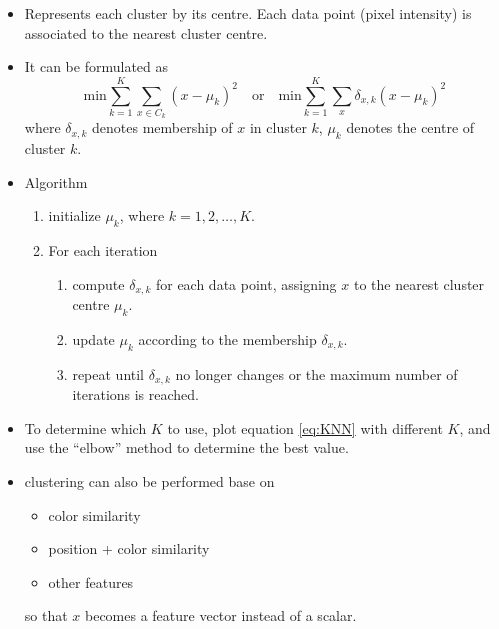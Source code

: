 \documentclass[twocolumn,landscape,10pt]{article}
\theoremstyle{definition}
\begin{document}
\begin{itemize}
    \item Represents each cluster by its centre.
        Each data point (pixel intensity) is associated to the nearest cluster
        centre.
    \item It can be formulated as
        \begin{equation}\label{eq:KNN}
            \text{min}\sum_{k=1}^{K} \sum_{x\in C_k}{(x-\mu_k)}^{2}
            \quad\text{or}\quad
            \text{min}\sum_{k=1}^{K} \sum_{x}\delta_{x,k}{(x-\mu_k)}^{2}
        \end{equation} 
        where $\delta_{x,k}$ denotes membership of $x$ in cluster $k$, $\mu_k$
        denotes the centre of cluster $k$.
    \item Algorithm
        \begin{enumerate}
            \item initialize $\mu_k$, where $k=1,2,\ldots,K$.
            \item For each iteration
                \begin{enumerate}
                    \item  compute $\delta_{x,k}$ for each data point, assigning
                        $x$ to the nearest cluster centre $\mu_k$.
                    \item update $\mu_k$ according to the membership
                        $\delta_{x,k}$.
                    \item repeat until $\delta_{x,k}$ no longer changes or the
                        maximum number of iterations is reached.
                \end{enumerate} 
        \end{enumerate} 
    \item To determine which $K$ to use, plot equation \eqref{eq:KNN} with
        different $K$, and use the ``elbow'' method to determine the best value.
    \item clustering can also be performed base on
        \begin{itemize}
            \item color similarity
            \item position + color similarity
            \item other features
        \end{itemize} 
        so that $x$ becomes a feature vector instead of a scalar.
\end{itemize} 
\end{document}
